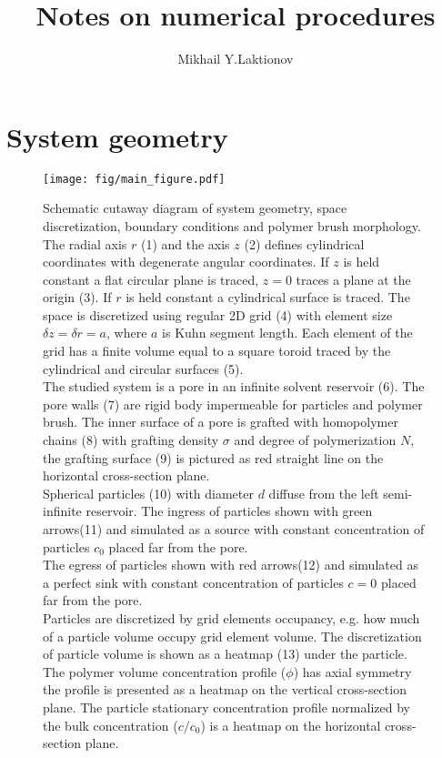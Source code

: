 \documentclass[12pt, a4paper]{article}
\begin{document}
\title{Notes on numerical procedures}
\author{Mikhail Y.Laktionov}
\maketitle

\section{System geometry}


\begin{figure}
    \centering
    \texttt{[image: fig/main\_figure.pdf]}
    \caption{
        Schematic cutaway diagram of system geometry, space discretization, boundary conditions and polymer brush morphology.
        The radial axis $r$ (1) and the axis $z$ (2) defines cylindrical coordinates with degenerate angular coordinates.
        If $z$ is held constant a flat circular plane is traced, $z=0$ traces a plane at the origin (3). 
        If $r$ is held constant a cylindrical surface is traced.
        The space is discretized using regular 2D grid (4) with element size $\delta z = \delta r = a$, where $a$ is Kuhn segment length.
        Each element of the grid has a finite volume equal to a square toroid traced by the cylindrical and circular surfaces (5).
        \\
        The studied system is a pore in an infinite solvent reservoir (6).
        The pore walls (7) are rigid body impermeable for particles and polymer brush. The inner surface of a pore is grafted with homopolymer chains (8) with grafting density $\sigma$ and degree of polymerization $N$, 
        the grafting surface (9) is pictured as red straight line on the horizontal cross-section plane.
        \\
        Spherical particles (10) with diameter $d$ diffuse from the left semi-infinite reservoir. 
        The ingress of particles shown with green arrows(11) and simulated as a source with constant concentration of particles $c_0$ placed far from the pore.
        \\
        The egress of particles shown with red arrows(12) and simulated as a perfect sink with constant concentration of particles $c=0$ placed far from the pore.
        \\
        Particles are discretized by grid elements occupancy, e.g. how much of a particle volume occupy grid element volume. The discretization of particle volume is shown as a heatmap (13) under the particle.  
        \\
        The polymer volume concentration profile ($\phi$) has axial symmetry the profile is presented as a heatmap on the vertical cross-section plane. 
        The particle stationary concentration profile normalized by the bulk concentration ($c/c_0$) is a heatmap on the horizontal cross-section plane.
    }
    \label{fig:main}
\end{figure}
    
\end{document}
